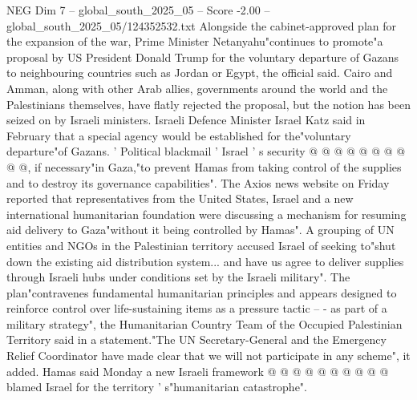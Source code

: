 \begin{textsample}{NEG Dim 7 – global\_south\_2025\_05 – Score -2.00 – global\_south\_2025\_05/124352532.txt}
Alongside the cabinet-approved plan for the expansion of the war, Prime Minister Netanyahu"continues to promote"a proposal by US President Donald Trump for the voluntary departure of Gazans to neighbouring countries such as Jordan or Egypt, the official said.
Cairo and Amman, along with other Arab allies, governments around the world and the Palestinians themselves, have flatly rejected the proposal, but the notion has been seized on by Israeli ministers.
Israeli Defence Minister Israel Katz said in February that a special agency would be established for the"voluntary departure"of Gazans. ' Political blackmail ' Israel ' s security @ @ @ @ @ @ @ @ @ @, if necessary"in Gaza,"to prevent Hamas from taking control of the supplies and to destroy its governance capabilities".
The Axios news website on Friday reported that representatives from the United States, Israel and a new international humanitarian foundation were discussing a mechanism for resuming aid delivery to Gaza"without it being controlled by Hamas".
A grouping of UN entities and NGOs in the Palestinian territory accused Israel of seeking to"shut down the existing aid distribution system... and have us agree to deliver supplies through Israeli hubs under conditions set by the Israeli military".
The plan"contravenes fundamental humanitarian principles and appears designed to reinforce control over life-sustaining items as a pressure tactic -- - as part of a military strategy", the Humanitarian Country Team of the Occupied Palestinian Territory said in a statement."The UN Secretary-General and the Emergency Relief Coordinator have made clear that we will not participate in any scheme", it added.
Hamas said Monday a new Israeli framework @ @ @ @ @ @ @ @ @ @ blamed Israel for the territory ' s"humanitarian catastrophe".

\end{textsample}

